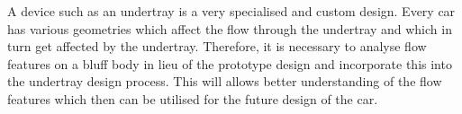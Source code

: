 \noindent A device such as an undertray is a very specialised and custom design. Every car has various geometries which affect the flow through the undertray and which in turn get affected by the undertray. Therefore, it is necessary to analyse flow features on a bluff body in lieu of the prototype design and incorporate this into the undertray design process. This will allows better understanding of the flow features which then can be utilised for the future design of the car.

